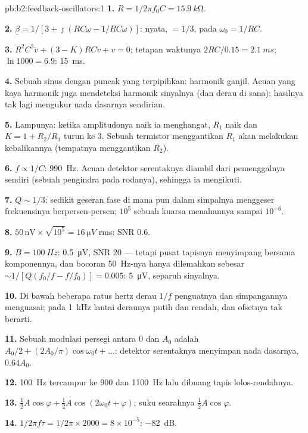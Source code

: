 \begin{solution}{pb:b2:feedback-oscillators:1}
\textbf{1.} $R = 1/2\pi f_0C = \qty{15.9}{k\ohm}$.

\textbf{2.} $\underline\beta = 1/[3 + \jmath(RC\omega - 1/RC\omega)]$: nyata, $= 1/3$, pada
$\omega_0 = 1/RC$.

\textbf{3.} $R^2C^2\ddot v + (3 - K)RC\dot v + v = 0$; tetapan waktunya $2RC/0.15 =
\qty{2.1}{ms}$; $\ln1000 = 6.9$: \qty{15}{ms}.

\textbf{4.} Sebuah sinus dengan puncak yang terpipihkan: harmonik ganjil. Acuan yang kaya
harmonik juga mendeteksi harmonik sinyalnya (dan derau di sana):
hasilnya tak lagi mengukur nada dasarnya sendirian.

\textbf{5.} Lampunya: ketika amplitudonya naik ia menghangat, $R_1$ naik dan
$K = 1 + R_2/R_1$ turun ke $3$. Sebuah termistor menggantikan $R_1$ akan melakukan
kebalikannya (tempatnya menggantikan $R_2$).

\textbf{6.} $f \propto 1/C$: \qty{990}{Hz}. Acuan detektor serentaknya diambil dari
pemenggalnya sendiri (sebuah pengindra pada rodanya), sehingga ia mengikuti.

\textbf{7.} $Q \sim 1/3$: sedikit geseran fase di mana pun dalam simpalnya menggeser
frekuensinya berpersen-persen; $10^5$ sebuah kuarsa menahannya sampai $10^{-6}$.

\textbf{8.} $50\,\text{nV} \times \sqrt{10^5} = \qty{16}{\micro V}$ rms: SNR $0.6$.

\textbf{9.} $B = \qty{100}{Hz}$: \qty{0.5}{\micro V}, SNR $20$ --- tetapi pusat tapisnya
menyimpang bersama komponennya, dan bocoran \qty{50}{Hz}-nya hanya
dilemahkan sebesar $\sim 1/[Q(f_0/f - f/f_0)] = 0.005$: \qty{5}{\micro V}, separuh
sinyalnya.

\textbf{10.} Di bawah beberapa ratus hertz derau $1/f$ penguatnya dan
simpangannya menguasai; pada \qty{1}{kHz} lantai deraunya putih dan rendah, dan
ofsetnya tak berarti.

\textbf{11.} Sebuah modulasi persegi antara $0$ dan $A_0$ adalah $A_0/2 + (2A_0/\pi)
\cos\omega_0t + \dots$: detektor serentaknya menyimpan nada dasarnya, $0.64A_0$.

\textbf{12.} \qty{100}{Hz} tercampur ke $900$ dan \qty{1100}{Hz} lalu dibuang
tapis lolos-rendahnya.

\textbf{13.} $\tfrac12A\cos\varphi + \tfrac12A\cos(2\omega_0t + \varphi)$; suku searahnya $\tfrac12A\cos\varphi$.

\textbf{14.} $1/2\pi f\tau = 1/2\pi \times 2000 = 8 \times 10^{-5}$: \qty{-82}{dB}.


\end{solution}
